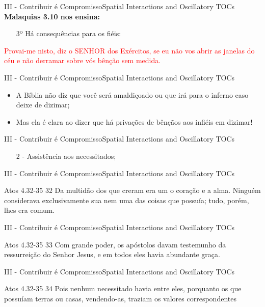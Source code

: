 \documentclass[14pt,aspectratio=169]{beamer}
\newcommand{\TT}{Spatial Interactions and Oscillatory TOCs}
\newcommand{\PIII}{III - Contribuir é Compromisso}
\begin{document}
\begin{frame}{\PIII}{\TT}
 \textbf{Malaquias 3.10 nos ensina:}
 \begin{enumerate}
  \item[3º] Há consequências para os fiéis:\pause  
 \end{enumerate}
  \begin{center}
  \textcolor{red}{Provai-me nisto, diz o SENHOR dos Exércitos, se eu não vos abrir as janelas do céu e não derramar sobre vós bênção sem medida.}
  \end{center}
\end{frame}

\begin{frame}{\PIII}{\TT}
 \begin{itemize}
     \item A Bíblia não diz que você será amaldiçoado ou que irá para o inferno caso deixe de dizimar;\pause
     \item Mas ela é clara ao dizer que há privações de bênçãos aos infiéis em dizimar!
 \end{itemize}
\end{frame}

\begin{frame}{\PIII}{\TT}
 \begin{enumerate}
  \item[2 -] Assistência aos necessitados;
 \end{enumerate}
\end{frame}

\begin{frame}{\PIII}{\TT}
 \begin{block}{Atos 4.32-35}
32 Da multidão dos que creram era um o coração e a alma. Ninguém considerava exclusivamente sua nem uma das coisas que possuía; tudo, porém, lhes era comum.
 \end{block}
\end{frame}

\begin{frame}{\PIII}{\TT}
 \begin{block}{Atos 4.32-35}
33 Com grande poder, os apóstolos davam testemunho da ressurreição do Senhor Jesus, e em todos eles havia abundante graça.
 \end{block}
\end{frame}

\begin{frame}{\PIII}{\TT}
 \begin{block}{Atos 4.32-35}
34 Pois nenhum necessitado havia entre eles, porquanto os que possuíam terras ou casas, vendendo-as, traziam os valores correspondentes
 \end{block}
\end{frame}
\end{document}
